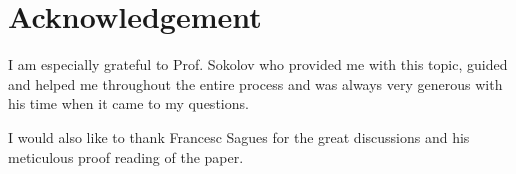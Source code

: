 
\chapter*{Acknowledgement}

I am especially grateful to Prof. Sokolov who provided me with this topic, guided and helped me throughout the entire process and was always very generous with his time when it came to my questions.

I would also like to thank Francesc Sagues for the great discussions and his meticulous proof reading of the paper.
